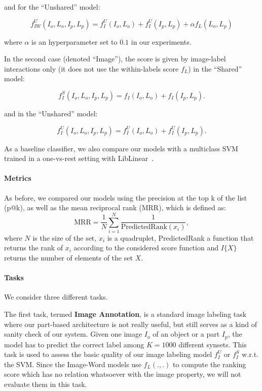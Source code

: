 and for the ``Unshared'' model:

\[
f_{IW}^U(I_o,L_o,I_p,L_p) = f_I^U(I_o,L_o) + f_I^U(I_p,L_p) + \alpha f_{L}(L_o,L_p)
\]


where $\alpha$ is an hyperparameter set to $0.1$ in our experiments.


In the second case (denoted ``Image''), the score is given by image-label interactions only
(it does not use the within-labels score $f_L$) in the ``Shared'' model:

\[
f_I^S(I_o,L_o,I_p,L_p) = f_I(I_o,L_o) + f_I(I_p,L_p) .
\]

and in the ``Unshared'' model:

\[
f_I^U(I_o,L_o,I_p,L_p) = f_I^U(I_o,L_o) + f_I^U(I_p,L_p) .
\]

As a baseline classifier, we also compare our models with a multiclass SVM
trained in a one-vs-rest setting with LibLinear~\citep{liblinear}.




\paragraph{Metrics}

As before, we compared our models using the precision at the top k of the list
(p@k), as well as the mean reciprocal rank (MRR), which is defined as:
\[
  \textrm{MRR} = \frac{1}{N} \sum_{i=1}^{N} \dfrac{1}{\textrm{PredictedRank}(x_i)},
\]
where $N$ is the size of the set, $x_i$ is a quadruplet, PredictedRank
a function that returns the rank of $x_i$ according to the considered
score function and $I\{X\}$ returns the number of elements of the set $X$.

\paragraph{Tasks}%
We consider three different tasks.

The first task, termed {\bf Image Annotation}, is a standard image labeling
task where our part-based architecture is not really useful, but still serves
as a kind of sanity check of our system. Given one image $I_o$ of an object or
a part $I_p$, the model has to predict the correct label among $K=1000$
different synsets.
%
This task is used to assess the basic quality of our image labeling model
$f_I^U$ or $f_I^S$ w.r.t. the SVM.  Since the Image-Word models use $f_L(.,.)$
to compute the ranking score which has no relation whatsoever with the image
property, we will not evaluate them in this task.

